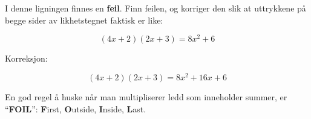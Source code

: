 

I denne ligningen finnes en {\bf feil}. Finn feilen, og korriger den slik at uttrykkene på begge sider av likhetstegnet faktisk er like:

$$(4x + 2)(2x + 3) = 8x^2 + 6$$







Korreksjon:

$$(4x + 2)(2x + 3) = 8x^2 + 16x + 6$$







En god regel å huske når man multipliserer ledd som inneholder summer, er ``{\bf FOIL}'': {\bf F}irst, {\bf O}utside, {\bf I}nside, {\bf L}ast.



